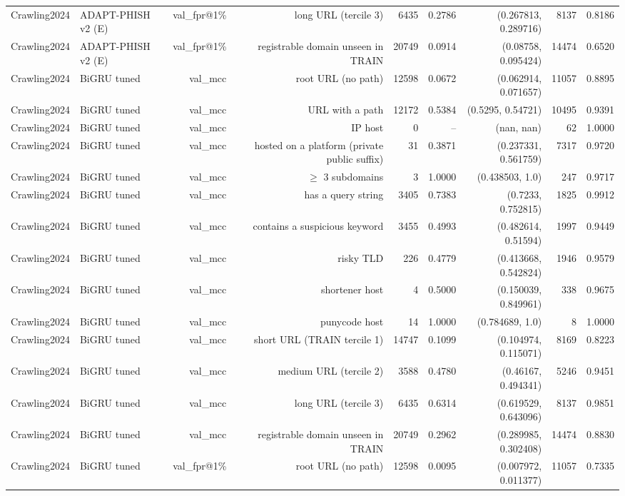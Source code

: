 \begin{table}[t]
\begin{tabular}{llrrrrrrr}
Crawling2024 & ADAPT-PHISH v2 (E) & val\_fpr@1\% & long URL (tercile 3) & 6435 & 0.2786 & (0.267813, 0.289716) & 8137 & 0.8186 \\
Crawling2024 & ADAPT-PHISH v2 (E) & val\_fpr@1\% & registrable domain unseen in TRAIN & 20749 & 0.0914 & (0.08758, 0.095424) & 14474 & 0.6520 \\
Crawling2024 & BiGRU tuned & val\_mcc & root URL (no path) & 12598 & 0.0672 & (0.062914, 0.071657) & 11057 & 0.8895 \\
Crawling2024 & BiGRU tuned & val\_mcc & URL with a path & 12172 & 0.5384 & (0.5295, 0.54721) & 10495 & 0.9391 \\
Crawling2024 & BiGRU tuned & val\_mcc & IP host & 0 & -- & (nan, nan) & 62 & 1.0000 \\
Crawling2024 & BiGRU tuned & val\_mcc & hosted on a platform (private public suffix) & 31 & 0.3871 & (0.237331, 0.561759) & 7317 & 0.9720 \\
Crawling2024 & BiGRU tuned & val\_mcc & $\geq$ 3 subdomains & 3 & 1.0000 & (0.438503, 1.0) & 247 & 0.9717 \\
Crawling2024 & BiGRU tuned & val\_mcc & has a query string & 3405 & 0.7383 & (0.7233, 0.752815) & 1825 & 0.9912 \\
Crawling2024 & BiGRU tuned & val\_mcc & contains a suspicious keyword & 3455 & 0.4993 & (0.482614, 0.51594) & 1997 & 0.9449 \\
Crawling2024 & BiGRU tuned & val\_mcc & risky TLD & 226 & 0.4779 & (0.413668, 0.542824) & 1946 & 0.9579 \\
Crawling2024 & BiGRU tuned & val\_mcc & shortener host & 4 & 0.5000 & (0.150039, 0.849961) & 338 & 0.9675 \\
Crawling2024 & BiGRU tuned & val\_mcc & punycode host & 14 & 1.0000 & (0.784689, 1.0) & 8 & 1.0000 \\
Crawling2024 & BiGRU tuned & val\_mcc & short URL (TRAIN tercile 1) & 14747 & 0.1099 & (0.104974, 0.115071) & 8169 & 0.8223 \\
Crawling2024 & BiGRU tuned & val\_mcc & medium URL (tercile 2) & 3588 & 0.4780 & (0.46167, 0.494341) & 5246 & 0.9451 \\
Crawling2024 & BiGRU tuned & val\_mcc & long URL (tercile 3) & 6435 & 0.6314 & (0.619529, 0.643096) & 8137 & 0.9851 \\
Crawling2024 & BiGRU tuned & val\_mcc & registrable domain unseen in TRAIN & 20749 & 0.2962 & (0.289985, 0.302408) & 14474 & 0.8830 \\
Crawling2024 & BiGRU tuned & val\_fpr@1\% & root URL (no path) & 12598 & 0.0095 & (0.007972, 0.011377) & 11057 & 0.7335 \\

\end{tabular}
\end{table}
